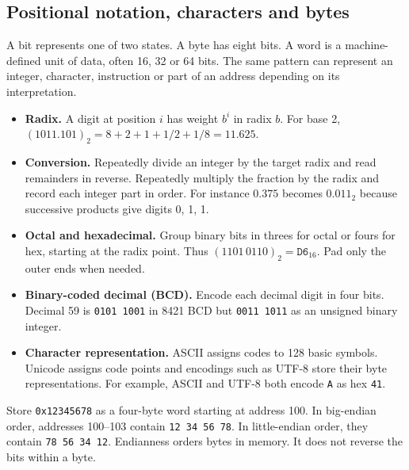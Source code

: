 \documentclass[12pt,a4paper]{article}
\begin{document}
\subsection{Positional notation, characters and bytes}
\begin{tcolorbox}[defbox,title={Bit, byte and word}]
A bit represents one of two states. A byte has eight bits. A word is a machine-defined unit of data, often 16, 32 or 64 bits. The same pattern can represent an integer, character, instruction or part of an address depending on its interpretation.
\end{tcolorbox}
\begin{itemize}[leftmargin=*,itemsep=3pt]
\item \textbf{Radix.} A digit at position $i$ has weight $b^i$ in radix $b$. For base 2, $(1011.101)_2=8+2+1+1/2+1/8=11.625$.
\item \textbf{Conversion.} Repeatedly divide an integer by the target radix and read remainders in reverse. Repeatedly multiply the fraction by the radix and record each integer part in order. For instance $0.375$ becomes $0.011_2$ because successive products give digits 0, 1, 1.
\item \textbf{Octal and hexadecimal.} Group binary bits in threes for octal or fours for hex, starting at the radix point. Thus $(1101\,0110)_2=\texttt{D6}_{16}$. Pad only the outer ends when needed.
\item \textbf{Binary-coded decimal (BCD).} Encode each decimal digit in four bits. Decimal 59 is \texttt{0101 1001} in 8421 BCD but \texttt{0011 1011} as an unsigned binary integer.
\item \textbf{Character representation.} ASCII assigns codes to 128 basic symbols. Unicode assigns code points and encodings such as UTF-8 store their byte representations. For example, ASCII and UTF-8 both encode \texttt{A} as hex \texttt{41}.
\end{itemize}
\begin{tcolorbox}[examplebox,title={Identify endianness by increasing addresses}]
Store \texttt{0x12345678} as a four-byte word starting at address 100. In big-endian order, addresses 100--103 contain \texttt{12 34 56 78}. In little-endian order, they contain \texttt{78 56 34 12}. Endianness orders bytes in memory. It does not reverse the bits within a byte.
\end{tcolorbox}
\end{document}
